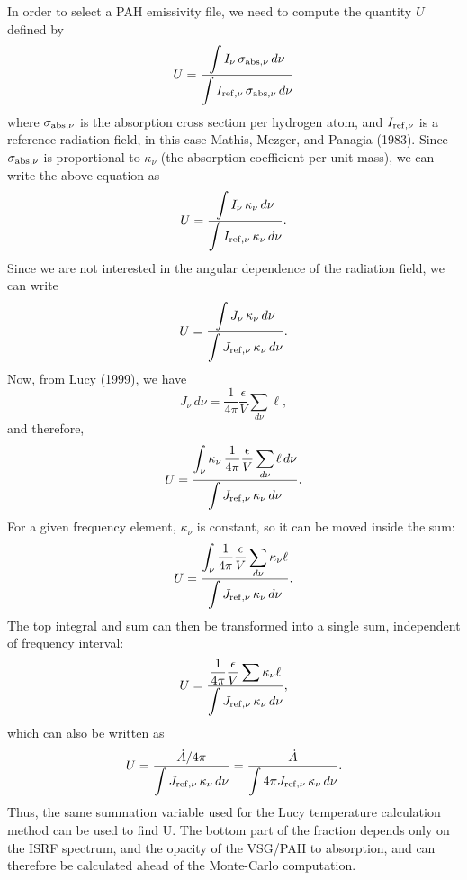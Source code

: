\documentclass[11pt]{article}
\begin{document}
In order to select a PAH emissivity file, we need to compute the quantity $U$ defined by
\begin{equation}
U=\frac{\displaystyle{\int I_\nu\,\sigma_{\rm abs, \nu}\,d\nu}}{\displaystyle{\int I_{\rm ref,\nu}\,\sigma_{\rm abs, \nu}\,d\nu}}
\end{equation}
where $\sigma_{\rm abs, \nu}$ is the absorption cross section per hydrogen atom, and $I_{\rm ref,\nu}$ is a reference radiation field, in this case Mathis, Mezger, and Panagia (1983). Since $\sigma_{\rm abs, \nu}$ is proportional to $\kappa_\nu$ (the absorption coefficient per unit mass), we can write the above equation as 
\begin{equation}
U=\frac{\displaystyle{\int I_\nu\,\kappa_\nu\,d\nu}}{\displaystyle{\int I_{\rm ref,\nu}\,\kappa_\nu\,d\nu}}.
\end{equation}
Since we are not interested in the angular dependence of the radiation field, we can write
\begin{equation}
U=\frac{\displaystyle{\int J_\nu\,\kappa_\nu\,d\nu}}{\displaystyle{\int J_{\rm ref,\nu}\,\kappa_\nu\,d\nu}}.
\end{equation}
Now, from Lucy (1999), we have
\begin{equation}
J_\nu\,d\nu = \frac{1}{4\pi}\frac{\epsilon}{V}\sum_{d\nu} \ell,
\end{equation}
and therefore, 
\begin{equation}
U=\frac{\displaystyle{\int_\nu \kappa_\nu\,\frac{1}{4\pi}\frac{\epsilon}{V}\sum_{d\nu} \ell\,d\nu}}{\displaystyle{\int J_{\rm ref,\nu}\,\kappa_\nu\,d\nu}}.
\end{equation}
For a given frequency element, $\kappa_\nu$ is constant, so it can be moved inside the sum:
\begin{equation}
U=\frac{\displaystyle{\int_\nu \frac{1}{4\pi}\frac{\epsilon}{V}\sum_{d\nu} \kappa_\nu \ell}}{\displaystyle{\int J_{\rm ref,\nu}\,\kappa_\nu\,d\nu}}.
\end{equation}
The top integral and sum can then be transformed into a single sum, independent of frequency interval:
\begin{equation}
U=\frac{\displaystyle{\frac{1}{4\pi}\frac{\epsilon}{V}\sum\kappa_\nu \ell}}{\displaystyle{\int J_{\rm ref,\nu}\,\kappa_\nu\,d\nu}},
\end{equation}
which can also be written as 
\begin{equation}
U=\frac{\displaystyle{\dot{A}/4\pi}}{\displaystyle{\int J_{\rm ref,\nu}\,\kappa_\nu\,d\nu}} = \frac{\displaystyle{\dot{A}}}{\displaystyle{\int 4\pi J_{\rm ref,\nu}\,\kappa_\nu\,d\nu}}.
\end{equation}
Thus, the same summation variable used for the Lucy temperature calculation method can be used to find U. The bottom part of the fraction depends only on the ISRF spectrum, and the opacity of the VSG/PAH to absorption, and can therefore be calculated ahead of the Monte-Carlo computation.
\end{document}
